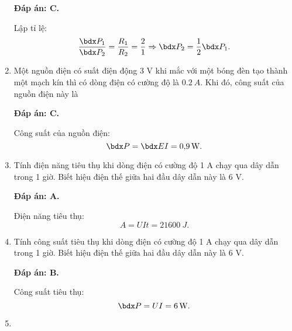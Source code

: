 \begin{enumerate}[label=\bfseries Câu \arabic*:]
{	}
	\loigiai
	{	\textbf{Đáp án: C.}
		
		Lập tỉ lệ:
		$$\dfrac{\calP_1}{\calP_2} = \dfrac{R_1}{R_2} = \dfrac{2}{1} \Rightarrow \calP_2 = \dfrac{1}{2} \calP_1.$$
	}
	\item {}
	
	\cauhoi
	{Một nguồn điện có suất điện động 3 V khi mắc với một bóng đèn tạo thành một mạch kín thì có dòng điện có cường độ là $\SI{0.2}{A}$. Khi đó, công suất của nguồn điện này là
		
	}
	\loigiai
	{	\textbf{Đáp án: C.}
		
		Công suất của nguồn điện:
		$$\calP = \calE I = \SI{0.9}{W}.$$
	}
	\item {}
	
	\cauhoi
	{Tính điện năng tiêu thụ khi dòng điện có cường độ 1 A chạy qua dây dẫn trong 1 giờ. Biết hiệu điện thế giữa hai đầu dây dẫn này là 6 V.
		
	}
	\loigiai
	{	\textbf{Đáp án: A.}
		
		Điện năng tiêu thụ:
		$$A=UI t = \SI{21600}{J}.$$
	}
	\item {}
	
	\cauhoi
	{Tính công suất tiêu thụ khi dòng điện có cường độ 1 A chạy qua dây dẫn trong 1 giờ. Biết hiệu điện thế giữa hai đầu dây dẫn này là 6 V.
		
	}
	\loigiai
	{	\textbf{Đáp án: B.}
		
		Công suất tiêu thụ:
		$$\calP = UI = \SI{6}{W}.$$
	}
	\item {}
	

\end{enumerate}
